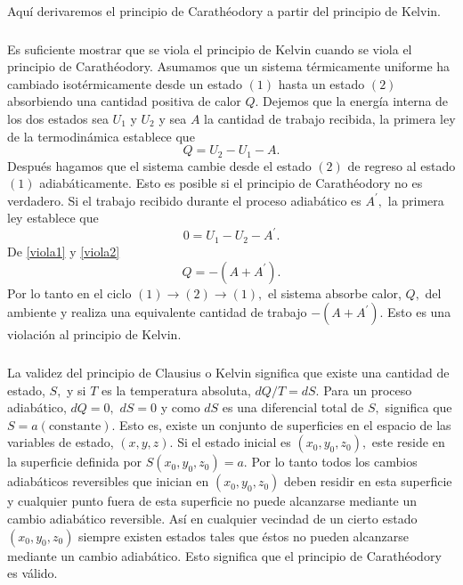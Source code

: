\documentclass{article}
\theoremstyle{definition} \newtheorem{defi}{Definici\'on}
\theoremstyle{definition} \newtheorem{teo}{Teorema}
\theoremstyle{definition} \newtheorem{cor}{Corolario}
\begin{document}
\paragraph{}
Aqu\'i derivaremos el principio de Carath\'eodory a partir del principio de Kelvin.
\subparagraph{}
Es suficiente mostrar que se viola el principio de Kelvin cuando se viola el principio de Carath\'eodory. Asumamos que un sistema t\'ermicamente uniforme ha cambiado isot\'ermicamente desde un estado $(1)$ hasta un estado $(2)$ absorbiendo una cantidad positiva de calor $Q.$ Dejemos que la energ\'ia interna de los dos estados sea $U_1$ y $U_2$ y sea $A$ la cantidad de trabajo recibida, la primera ley de la termodin\'amica establece que
\begin{equation}\label{viola1}
Q=U_2-U_1-A.
\end{equation}
Despu\'es hagamos que el sistema cambie desde el estado $(2)$ de regreso al estado $(1)$ adiab\'aticamente. Esto es posible si el principio de Carath\'eodory no es verdadero. Si el trabajo recibido durante el proceso adiab\'atico es $A^{\prime},$ la primera ley establece que
\begin{equation}\label{viola2}
0=U_1-U_2-A^{\prime}.
\end{equation}
De \eqref{viola1} y \eqref{viola2}
\begin{equation}
Q=-(A+A^{\prime}).
\end{equation}
Por lo tanto en el ciclo $(1)\rightarrow (2)\rightarrow (1),$ el sistema absorbe calor, $Q,$ del ambiente y realiza una equivalente cantidad de trabajo $-(A+A^{\prime}).$ Esto es una violaci\'on al principio de Kelvin.
\subparagraph{}
La validez del principio de Clausius o Kelvin significa que existe una cantidad de estado, $S,$ y si $T$ es la temperatura absoluta, $dQ/T=dS.$ Para un proceso adiab\'atico, $dQ=0,$ $dS=0$ y como $dS$ es una diferencial total de $S,$ significa que $S=a(\text{constante}).$ Esto es, existe un conjunto de superficies en el espacio de las variables de estado, $(x,y,z).$ Si el estado inicial es $(x_0,y_0,z_0),$ este reside en la superficie definida por $S(x_0,y_0,z_0)=a.$ Por lo tanto todos los cambios adiab\'aticos reversibles que inician en $(x_0,y_0,z_0)$ deben residir en esta superficie y cualquier punto fuera de esta superficie no puede alcanzarse mediante un cambio adiab\'atico reversible. As\'i en cualquier vecindad de un cierto estado $(x_0,y_0,z_0)$ siempre existen estados tales que \'estos no pueden alcanzarse mediante un cambio adiab\'atico. Esto significa que el principio de Carath\'eodory es v\'alido.
\end{document}
